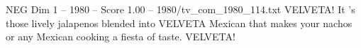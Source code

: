\begin{textsample}{NEG Dim 1 – 1980 – Score 1.00 – 1980/tv\_com\_1980\_114.txt}  \label{ex:f1_neg_059}
VELVETA!
It 's those lively jalapenos blended into VELVETA Mexican that makes your nachos or any Mexican cooking a fiesta of taste.
VELVETA!

\end{textsample}
